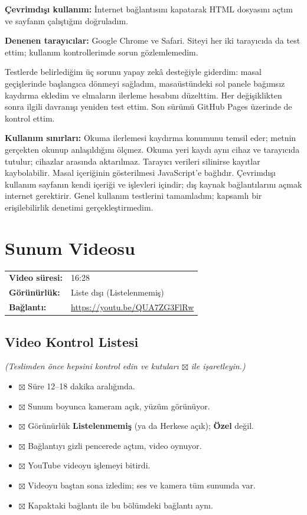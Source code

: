 \documentclass[12pt,a4paper]{article}
\newcommand{\aciklama}[1]{{\color{gray}\itshape (#1)}}
\newcommand{\youtubelink}{\url{https://youtu.be/QUA7ZG3FlRw}}
\begin{document}
\textbf{Çevrimdışı kullanım:} İnternet bağlantısını kapatarak HTML dosyasını açtım ve sayfanın çalıştığını doğruladım.

\textbf{Denenen tarayıcılar:} Google Chrome ve Safari. Siteyi her iki tarayıcıda da test ettim; kullanım kontrollerimde sorun gözlemlemedim.

Testlerde belirlediğim üç sorunu yapay zekâ desteğiyle giderdim: masal geçişlerinde başlangıca dönmeyi sağladım, masaüstündeki sol panele bağımsız kaydırma ekledim ve elmaların ilerleme hesabını düzelttim. Her değişiklikten sonra ilgili davranışı yeniden test ettim. Son sürümü GitHub Pages üzerinde de kontrol ettim.

\textbf{Kullanım sınırları:} Okuma ilerlemesi kaydırma konumunu temsil eder; metnin gerçekten okunup anlaşıldığını ölçmez. Okuma yeri kaydı aynı cihaz ve tarayıcıda tutulur; cihazlar arasında aktarılmaz. Tarayıcı verileri silinirse kayıtlar kaybolabilir. Masal içeriğinin gösterilmesi JavaScript'e bağlıdır. Çevrimdışı kullanım sayfanın kendi içeriği ve işlevleri içindir; dış kaynak bağlantılarını açmak internet gerektirir. Genel kullanım testlerini tamamladım; kapsamlı bir erişilebilirlik denetimi gerçekleştirmedim.

\clearpage
\section{Sunum Videosu}
\begin{center}
\begin{tabular}{@{}ll@{}}
\textbf{Video süresi:} & 16:28 \\
\textbf{Görünürlük:} & Liste dışı (Listelenmemiş) \\
\textbf{Bağlantı:} & \youtubelink \\
\end{tabular}
\end{center}

\subsection{Video Kontrol Listesi}
\aciklama{Teslimden önce hepsini kontrol edin ve kutuları $\boxtimes$ ile işaretleyin.}
\begin{itemize}[label={}]
  \item $\boxtimes$ Süre 12--18 dakika aralığında.
  \item $\boxtimes$ Sunum boyunca kameram açık, yüzüm görünüyor.
  \item $\boxtimes$ Görünürlük \textbf{Listelenmemiş} (ya da Herkese açık); \textbf{Özel} değil.
  \item $\boxtimes$ Bağlantıyı gizli pencerede açtım, video oynuyor.
  \item $\boxtimes$ YouTube videoyu işlemeyi bitirdi.
  \item $\boxtimes$ Videoyu baştan sona izledim; ses ve kamera tüm sunumda var.
  \item $\boxtimes$ Kapaktaki bağlantı ile bu bölümdeki bağlantı aynı.
\end{itemize}
\end{document}
